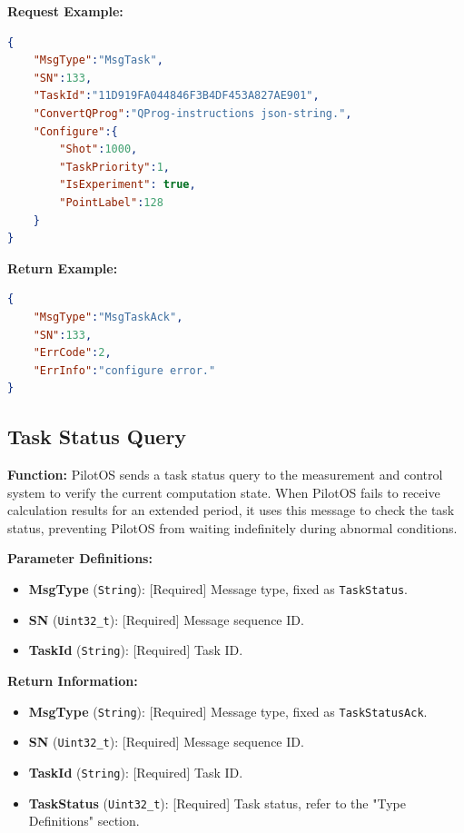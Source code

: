 \documentclass[12pt, a4paper]{article}
\begin{document}
\noindent \textbf{Request Example:}
\begin{lstlisting}[language=json]
{
    "MsgType":"MsgTask",
    "SN":133,
    "TaskId":"11D919FA044846F3B4DF453A827AE901",
    "ConvertQProg":"QProg-instructions json-string.",
    "Configure":{
        "Shot":1000,
        "TaskPriority":1,
        "IsExperiment": true,
        "PointLabel":128
    }
}
\end{lstlisting}

\noindent \textbf{Return Example:}
\begin{lstlisting}[language=json]
{
    "MsgType":"MsgTaskAck",
    "SN":133,
    "ErrCode":2,
    "ErrInfo":"configure error."
}
\end{lstlisting}

\subsection{Task Status Query}

\textbf{Function:} PilotOS sends a task status query to the measurement and control system to verify the current computation state. When PilotOS fails to receive calculation results for an extended period, it uses this message to check the task status, preventing PilotOS from waiting indefinitely during abnormal conditions.

\textbf{Parameter Definitions:}
\begin{itemize}
    \item \textbf{MsgType} (\texttt{String}): [Required] Message type, fixed as \texttt{TaskStatus}.
    \item \textbf{SN} (\texttt{Uint32\_t}): [Required] Message sequence ID.
    \item \textbf{TaskId} (\texttt{String}): [Required] Task ID.
\end{itemize}

\textbf{Return Information:}
\begin{itemize}
    \item \textbf{MsgType} (\texttt{String}): [Required] Message type, fixed as \texttt{TaskStatusAck}.
    \item \textbf{SN} (\texttt{Uint32\_t}): [Required] Message sequence ID.
    \item \textbf{TaskId} (\texttt{String}): [Required] Task ID.
    \item \textbf{TaskStatus} (\texttt{Uint32\_t}): [Required] Task status, refer to the "Type Definitions" section.
\end{itemize}
\end{document}
